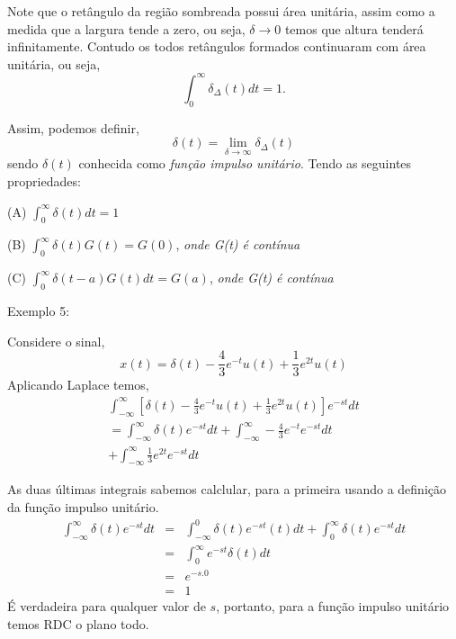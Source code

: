 \documentclass[9pt]{beamer}
\begin{document}
\begin{frame}
  Note que  o  ret\^{a}ngulo da regi\~{a}o sombreada possui \'{a}rea unit\'{a}ria, assim como a medida que a largura tende a zero, ou seja, $\delta \rightarrow 0 $ temos que
  altura tender\'{a} infinitamente. Contudo  os todos ret\^{a}ngulos formados continuaram com \'{a}rea unit\'{a}ria, ou seja,
  $$\int_{0}^{\infty} \delta_\Delta (t) dt = 1. $$
  \par
  Assim, podemos definir,
  $$ \delta (t) = \lim_{\delta \rightarrow\infty} \delta_\Delta (t) $$ 
  sendo $\delta (t)$  conhecida como \textit {fun\c{c}\~{a}o impulso unit\'{a}rio}. Tendo as seguintes propriedades:
  \newline
  \par
  (A) $ \int_{0}^{\infty} \delta (t) dt  = 1$
  \newline
  \par
  (B) $ \int_{0}^{\infty} \delta (t) G(t) = G(0)$, \textit{ onde G(t) \'{e} cont\'{i}nua}
  \newline
  \par
  (C) $ \int_{0}^{\infty} \delta(t - a)G(t) dt = G(a)$, \textit{ onde G(t) \'{e} cont\'{i}nua}
\end{frame}
\begin{frame}
  Exemplo 5: 
  \par 
  Considere o  sinal, $$ x(t) \equal \delta (t) -\frac {4} {3 } e^{-t} u(t) + \frac {1} {3} e^{2t} u(t) $$
  Aplicando Laplace temos,
  \begin{eqnarray}
    \int_{-\infty}^{\infty}  \left [ \delta (t) -\frac {4} {3} e^{-t} u (t) + \frac {1} {3} e^{2t} u (t) \right] e^{-st} dt  \nonumber \\
    = \int_{-\infty}^{\infty} \delta (t) e^{-st} dt  \nonumber  
    + \int_{-\infty}^{\infty} -\frac {4} {3} e^{-t} e^{-st} dt  \nonumber \\
    + \int_{-\infty}^{\infty} \frac {1} {3} e^{2t} e^{-st} dt \nonumber 
  \end{eqnarray}
\par
As duas \'{u}ltimas integrais sabemos calclular, para a primeira  usando a defini\c{c}\~{a}o da fun\c{c}\~{a}o impulso  unit\'{a}rio.
\begin{eqnarray}
  \int_{-\infty}^{\infty} \delta (t) e^{-st} dt & = & \int_{-\infty}^{0} \delta  (t) e^{-st} (t) dt + \int_{0}^{\infty} \delta (t) e^{-st}  dt \nonumber \\
  & = & \int_{0}^{\infty} e^{-st} \delta (t) dt \nonumber \\
   & = & e^{-s.0} \nonumber \\
   & = & 1 \nonumber
\end{eqnarray}
\'{E} verdadeira para qualquer valor de $s$, portanto, para a fun\c{c}\~{a}o impulso unit\'{a}rio temos RDC o plano todo.
\end{frame}
\end{document}
